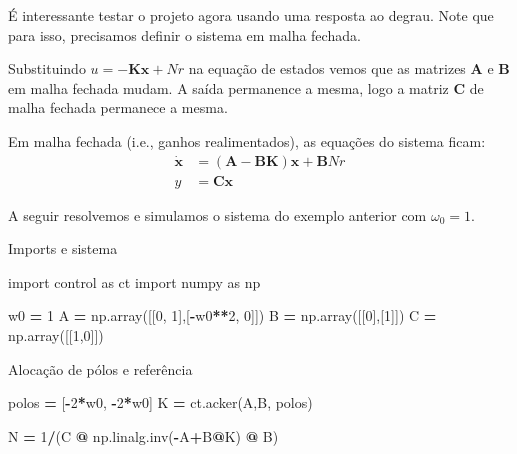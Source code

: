 \documentclass[
]{book}
\newenvironment{Shaded}{\begin{snugshade}}{\end{snugshade}}
\newcommand{\DecValTok}[1]{\textcolor[rgb]{0.00,0.00,0.81}{#1}}
\newcommand{\ImportTok}[1]{#1}
\newcommand{\NormalTok}[1]{#1}
\newcommand{\OperatorTok}[1]{\textcolor[rgb]{0.81,0.36,0.00}{\textbf{#1}}}
\begin{document}
É interessante testar o projeto agora usando uma resposta ao degrau. Note que para isso, precisamos definir o sistema em malha fechada.

Substituindo \(u=-\mathbf{Kx}+Nr\) na equação de estados vemos que as matrizes \(\mathbf{A}\) e \(\mathbf{B}\) em malha fechada mudam. A saída permanence a mesma, logo a matriz \(\mathbf{C}\) de malha fechada permanece a mesma.

Em malha fechada (i.e., ganhos realimentados), as equações do sistema ficam:
\begin{align}
    \mathbf{\dot{x}} &= \mathbf{(A-BK)x} +\mathbf{B}Nr\\
    y &= \mathbf{Cx}
\end{align}

A seguir resolvemos e simulamos o sistema do exemplo anterior com \(\omega_0=1\).

Imports e sistema

\begin{Shaded}
\begin{Highlighting}[]
\ImportTok{import}\NormalTok{ control }\ImportTok{as}\NormalTok{ ct}
\ImportTok{import}\NormalTok{ numpy }\ImportTok{as}\NormalTok{ np}

\NormalTok{w0 }\OperatorTok{=} \DecValTok{1}
\NormalTok{A }\OperatorTok{=}\NormalTok{ np.array([[}\DecValTok{0}\NormalTok{, }\DecValTok{1}\NormalTok{],[}\OperatorTok{{-}}\NormalTok{w0}\OperatorTok{**}\DecValTok{2}\NormalTok{, }\DecValTok{0}\NormalTok{]])}
\NormalTok{B }\OperatorTok{=}\NormalTok{ np.array([[}\DecValTok{0}\NormalTok{],[}\DecValTok{1}\NormalTok{]])}
\NormalTok{C }\OperatorTok{=}\NormalTok{ np.array([[}\DecValTok{1}\NormalTok{,}\DecValTok{0}\NormalTok{]])}
\end{Highlighting}
\end{Shaded}

Alocação de pólos e referência

\begin{Shaded}
\begin{Highlighting}[]
\NormalTok{polos }\OperatorTok{=}\NormalTok{ [}\OperatorTok{{-}}\DecValTok{2}\OperatorTok{*}\NormalTok{w0, }\OperatorTok{{-}}\DecValTok{2}\OperatorTok{*}\NormalTok{w0]}
\NormalTok{K }\OperatorTok{=}\NormalTok{ ct.acker(A,B, polos)}

\NormalTok{N }\OperatorTok{=} \DecValTok{1}\OperatorTok{/}\NormalTok{(C }\OperatorTok{@}\NormalTok{ np.linalg.inv(}\OperatorTok{{-}}\NormalTok{A}\OperatorTok{+}\NormalTok{B}\OperatorTok{@}\NormalTok{K) }\OperatorTok{@}\NormalTok{ B)}
\end{Highlighting}
\end{Shaded}
\end{document}
